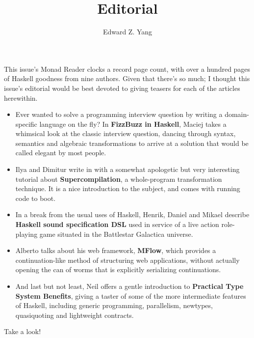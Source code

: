 \documentclass{tmr}
\title{Editorial}
\author{Edward Z. Yang\email{ezyang@cs.stanford.edu}}
\begin{document}
This issue's Monad Reader clocks a record page count, with over a hundred
pages of Haskell goodness from nine authors.  Given that there's so much;
I thought this issue's editorial would be best devoted to giving teasers
for each of the articles herewithin.

\begin{itemize}
    \item Ever wanted to solve a programming interview question by writing
        a domain-specific language on the fly?  In \textbf{FizzBuzz in
        Haskell}, Maciej takes a whimsical look at the classic interview
        question, dancing through syntax, semantics and algebraic
        transformations to arrive at a solution that would be called
        elegant by most people.

    \item Ilya and Dimitur write in with a somewhat apologetic but
        very interesting tutorial about \textbf{Supercompilation}, a
        whole-program transformation technique.  It is a nice introduction
        to the subject, and comes with running code to boot.

    \item In a break from the usual uses of Haskell, Henrik, Daniel and Mikael
        describe \textbf{Haskell sound specification DSL} used in service of a live
        action role-playing game situated in the Battlestar Galactica universe.

    \item Alberto talks about his web framework, \textbf{MFlow}, which provides
        a continuation-like method of structuring web applications, without actually
        opening the can of worms that is explicitly serializing continuations.

    \item And last but not least, Neil offers a gentle introduction to
        \textbf{Practical Type System Benefits}, giving a taster of some of
        the more intermediate features of Haskell, including generic
        programming, parallelism, newtypes, quasiquoting and lightweight
        contracts.
\end{itemize}

Take a look!
\end{document}
